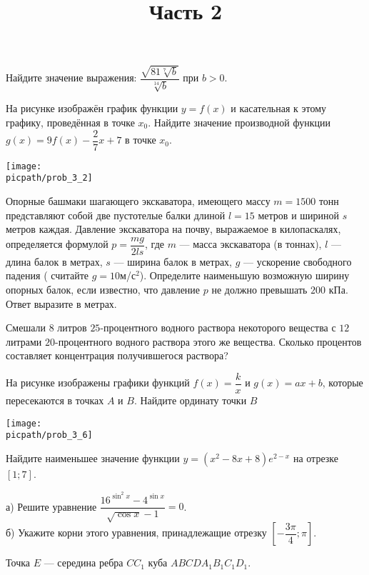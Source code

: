 \begin{training}[2]
\begin{listofex}
		\item Найдите значение выражения: \( \dfrac{\sqrt{81\sqrt[7]{b}}}{\sqrt[14]{b}} \) при \( b>0 \).
		\foranswer
		\item
		На рисунке изображён график функции \( y=f(x) \) и касательная к этому графику, проведённая в точке \( x_0 \). Найдите значение производной функции \( g(x)=9f(x)-\dfrac{2}{7}x+7 \) в точке \( x_0 \).
		\begin{center}
			\texttt{[image: \\picpath/prob\_3\_2]}
		\end{center}
		\foranswer
		\hphantom{Часть 1}
		\newpage
		\item Опорные башмаки шагающего экскаватора, имеющего массу \( m=1500 \) тонн представляют собой две пустотелые балки длиной \( l=15 \) метров и шириной \( s \) метров каждая. Давление экскаватора на почву, выражаемое в килопаскалях, определяется формулой \( p=\dfrac{mg}{2ls} \), где \( m \) --- масса экскаватора (в тоннах), \( l \) ---длина балок в метрах, \( s \) --- ширина балок в метрах, \( g \) --- ускорение свободного падения ( считайте \( g=10 \)м/с\( ^2 \)). Определите наименьшую возможную ширину опорных балок, если известно, что давление \( p \) не должно превышать \( 200 \) кПа. Ответ выразите в метрах.
		\foranswer
		\item Смешали \( 8 \) литров \( 25 \)-процентного водного раствора некоторого вещества с \( 12 \) литрами \( 20 \)-процентного водного раствора этого же вещества. Сколько процентов составляет концентрация получившегося раствора?
		\foranswer
		\item 
		На рисунке изображены графики функций \( f(x)=\dfrac{k}{x} \) и \( g(x)=ax+b \), которые пересекаются в точках \( A \) и \( B \). Найдите ординату точки \( B \)
		\begin{center}
			\texttt{[image: \\picpath/prob\_3\_6]}
		\end{center}
		\foranswer
		\item Найдите наименьшее значение функции \( y=(x^2-8x+8)e^{2-x} \) на отрезке \( \left[ 1; 7\right]  \).
		\foranswer
		\egepreambtwo
		\title{Часть 2}
		\item а) Решите уравнение \( \dfrac{16^{\sin^2x}-4^{\sin x}}{\sqrt{\cos x}-1}=0\). \\
		б) Укажите корни этого уравнения, принадлежащие отрезку \( \left[ -\dfrac{3\pi}{4};\pi \right]  \).
		\item Точка \( E \) --- середина ребра \( CC_1 \) куба \( ABCDA_1B_1C_1D_1 \). \\

\end{listofex}
\end{training}

